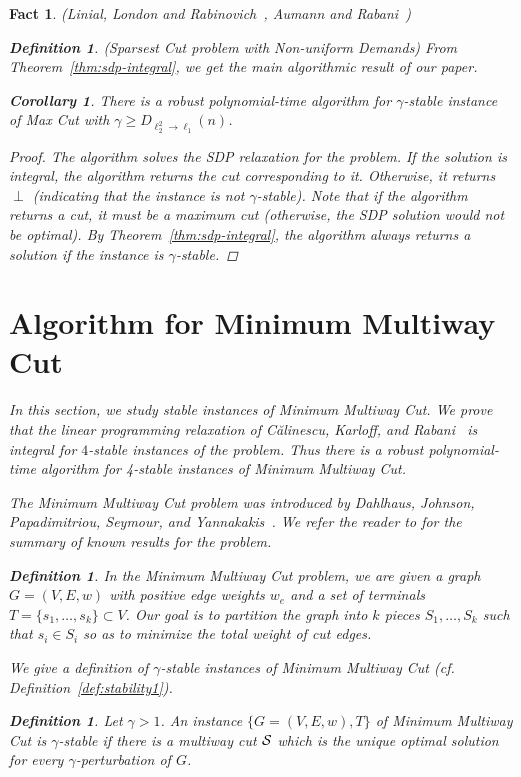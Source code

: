 \documentclass[twoside,leqno,twocolumn]{article}
\newtheorem{corollary}[theorem]{Corollary}
\newtheorem{Definition}[theorem]{Definition}
\newtheorem{fact}[theorem]{Fact}
\begin{document}
\begin{fact}{\sc (Linial, London and Rabinovich~\cite{LLR}, Aumann and Rabani~\cite{AR})}
\begin{Definition} {\sc (Sparsest Cut problem with Non-uniform Demands)}
From Theorem~\ref{thm:sdp-integral}, we get the main algorithmic result of our paper.
\begin{corollary}\label{cor:algorithm}
There is a robust polynomial-time algorithm for $\gamma$-stable instance of Max Cut with $\gamma \geq D_{\ell_2^2\to \ell_1}(n)$. 
\end{corollary}
\begin{proof}
The algorithm solves the SDP relaxation for the problem. If the solution is integral, the algorithm returns the cut
corresponding to it. Otherwise, it returns $\perp$ (indicating that the instance is not $\gamma$-stable). Note that if the algorithm
returns a cut, it must be a maximum cut (otherwise, the SDP solution would not be optimal).
By Theorem~\ref{thm:sdp-integral}, the algorithm always returns a solution if the instance is $\gamma$-stable.
\end{proof}

\section{Algorithm for Minimum Multiway Cut}\label{sec:muliway}
In this section, we study stable instances of Minimum Multiway Cut. We prove that the linear programming relaxation 
of C\u{a}linescu, Karloff, and Rabani~\cite{CKR} is integral for $4$-stable instances of the problem. Thus there is a
robust polynomial-time algorithm for 4-stable instances of Minimum Multiway Cut.

The Minimum Multiway Cut problem was introduced by 
Dahlhaus, Johnson, Papadimitriou, Seymour, and Yannakakis~\cite{DJPSY}.
We refer the reader to \cite{BNS} for the summary of known results for the problem.
\begin{Definition}
In the Minimum Multiway Cut problem, we are given a graph $G=(V,E,w)$ with positive edge weights $w_e$ and a set of terminals $T=\{s_1,\dots, s_k\}\subset V$.
Our goal is to partition the graph into $k$ pieces $S_1,\dots, S_k$ such that $s_i\in S_i$ so as 
to minimize the total weight of cut edges.
\end{Definition}


We give a definition of $\gamma$-stable instances of Minimum Multiway Cut (cf. Definition~\ref{def:stability1}).
\begin{Definition}
Let $\gamma > 1$.  An instance $\{G=(V,E,w),T\}$ of Minimum Multiway Cut is $\gamma$-stable if there is a multiway cut ${\cal S}$
which is the unique optimal solution for every $\gamma$-perturbation of $G$.
\end{Definition}


\end{Definition}
\end{fact}
\end{document}

